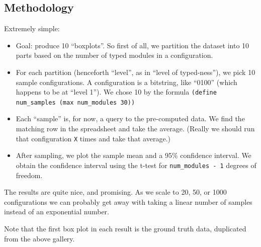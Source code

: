 \documentclass{article}
\begin{document}
\subsection{Methodology}
Extremely simple:
\begin{itemize}
\item
  Goal: produce 10 ``boxplots''.
  So first of all, we partition the dataset into 10 parts based on the number of typed modules in a configuration.
\item
  For each partition (henceforth ``level'', as in ``level of typed-ness''), we pick 10 sample configurations.
  A configuration is a bitstring, like ``0100'' (which happens to be at ``level 1'').
  We chose 10 by the formula \texttt{(define num\_samples (max num\_modules 30))}
\item
  Each ``sample'' is, for now, a query to the pre-computed data.
  We find the matching row in the spreadsheet and take the average.
  (Really we should run that configuration \texttt{X} times and take that average.)
\item
  After sampling, we plot the sample mean and a 95\% confidence interval.
  We obtain the confidence interval using the t-test for \texttt{num\_modules - 1} degrees of freedom.
\end{itemize}

The results are quite nice, and promising.
As we scale to 20, 50, or 1000 configurations we can probably get away with taking a linear number of samples instead of an exponential number.

Note that the first box plot in each result is the ground truth data, duplicated from the above gallery.

\newpage
\end{document}
